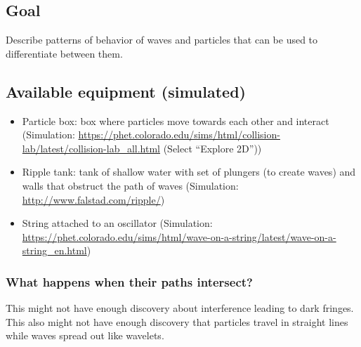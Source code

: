 \subsection{Goal}

Describe patterns of behavior of waves and particles that can be used to differentiate between them.




\subsection{Available equipment (simulated)}

\begin{itemize}
	\item Particle box: box where particles move towards each other and interact (Simulation:  \url{https://phet.colorado.edu/sims/html/collision-lab/latest/collision-lab_all.html} (Select ``Explore 2D''))

	\item Ripple tank: tank of shallow water with set of plungers (to create waves) and walls that obstruct the path of waves (Simulation: \url{http://www.falstad.com/ripple/})
	
	\item String attached to an oscillator (Simulation: \url{https://phet.colorado.edu/sims/html/wave-on-a-string/latest/wave-on-a-string_en.html})
\end{itemize}

\subsubsection{What happens when their paths intersect?}

{\color{red} This might not have enough discovery about interference leading to dark fringes. This also might not have enough discovery that particles travel in straight lines while waves spread out like wavelets.}

